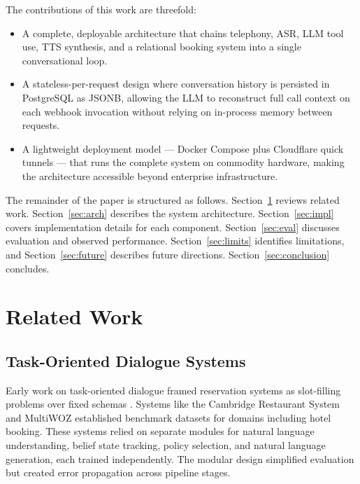 \documentclass[conference]{IEEEtran}
\begin{document}
The contributions of this work are threefold:

\begin{itemize}
  \item A complete, deployable architecture that chains telephony, ASR,
    LLM tool use, TTS synthesis, and a relational booking system into a single
    conversational loop.

  \item A stateless-per-request design where conversation history is persisted
    in PostgreSQL as JSONB, allowing the LLM to reconstruct full call context
    on each webhook invocation without relying on in-process memory between
    requests.

  \item A lightweight deployment model — Docker Compose plus Cloudflare
    quick tunnels — that runs the complete system on commodity hardware,
    making the architecture accessible beyond enterprise infrastructure.
\end{itemize}

The remainder of the paper is structured as follows. Section~\ref{sec:related}
reviews related work. Section~\ref{sec:arch} describes the system architecture.
Section~\ref{sec:impl} covers implementation details for each component.
Section~\ref{sec:eval} discusses evaluation and observed performance.
Section~\ref{sec:limits} identifies limitations, and Section~\ref{sec:future}
describes future directions. Section~\ref{sec:conclusion} concludes.


\section{Related Work}
\label{sec:related}

\subsection{Task-Oriented Dialogue Systems}

Early work on task-oriented dialogue framed reservation systems as slot-filling
problems over fixed schemas \cite{young2013pomdp}. Systems like the
Cambridge Restaurant System \cite{henderson2014second} and MultiWOZ
\cite{budzianowski2018multiwoz} established benchmark datasets for domains
including hotel booking. These systems relied on separate modules for natural
language understanding, belief state tracking, policy selection, and natural
language generation, each trained independently. The modular design simplified
evaluation but created error propagation across pipeline stages.
\end{document}
